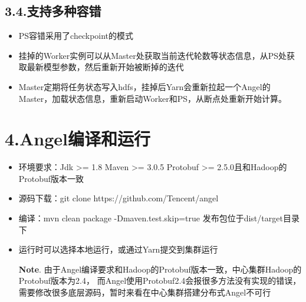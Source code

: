 \documentclass{article}
\begin{document}
\subsection{3.4.\hspace*{0.5em}支持多种容错}\label{section}%

\begin{itemize}[noitemsep,topsep=\mdcompacttopsep]%

\item{}PS容错采用了checkpoint的模式%

\item{}挂掉的Worker实例可以从Master处获取当前迭代轮数等状态信息，从PS处获取最新模型参数，然后重新开始被断掉的迭代%

\item{}Master定期将任务状态写入hdfs，挂掉后Yarn会重新拉起一个Angel的Master，加载状态信息，重新启动Worker和PS，从断点处重新开始计算。%
\end{itemize}%

\section{4.\hspace*{0.5em}Angel编译和运行}\label{sec-angel}%

\begin{itemize}[noitemsep,topsep=\mdcompacttopsep]%

\item{}环境要求：Jdk \textgreater{}= 1.8 Maven \textgreater{}= 3.0.5 Protobuf \textgreater{}= 2.5.0且和Hadoop的Protobuf版本一致%

\item{}源码下载：git clone https://github.com/Tencent/angel%

\item{}编译：mvn clean package -Dmaven.test.skip=true  发布包位于dist/target目录下%

\item{}运行时可以选择本地运行，或通过Yarn提交到集群运行

\noindent{}\textbf{Note}.
由于Angel编译要求和Hadoop的Protobuf版本一致，中心集群Hadoop的Protobuf版本为2.4，
而Angel使用Protobuf2.4会报很多方法没有实现的错误，需要修改很多底层源码，暂时来看在中心集群搭建分布式Angel不可行%
\end{itemize}%
\end{document}
